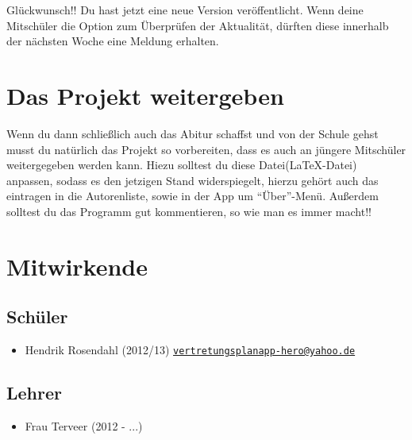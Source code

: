 \documentclass[12pt,headsepline]{scrartcl}
\begin{document}
 Glückwunsch!! Du hast jetzt eine neue Version veröffentlicht. Wenn deine Mitschüler die Option zum Überprüfen der Aktualität, dürften diese innerhalb der nächsten Woche eine Meldung erhalten.

\section{Das Projekt weitergeben}
Wenn du dann schließlich auch das Abitur schaffst und von der Schule gehst musst du natürlich das Projekt so vorbereiten, dass es auch an jüngere Mitschüler weitergegeben werden kann. Hiezu solltest du diese Datei(\LaTeX-Datei) anpassen, sodass es den jetzigen Stand widerspiegelt, hierzu gehört auch das eintragen in die Autorenliste, sowie in der App um ``Über''-Menü. Außerdem solltest du das Programm gut kommentieren, so wie man es immer macht!!

\section{Mitwirkende}
\subsection{Schüler}
\begin{itemize}
 \item Hendrik Rosendahl (2012/13) \href{mailto:vertretungsplanapp-hero@yahoo.de?subject=Vertretungsplan-App}{\texttt{vertretungsplanapp-hero@yahoo.de}}
\end{itemize}
\subsection{Lehrer}
\begin{itemize}
 \item Frau Terveer (2012 - ...)
\end{itemize}
\end{document}
